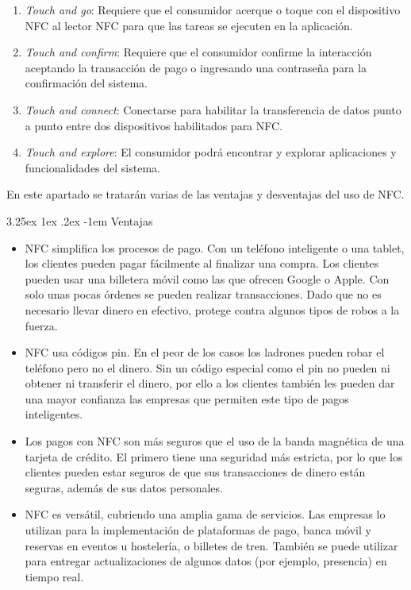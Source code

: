 \documentclass[12pt,a4paper,onecolumn,oneside]{report}
\makeatletter
\newcounter{subsubsubsection}[subsubsection]
\renewcommand\paragraph{\@startsection{paragraph}{5}{\z@}%
  {3.25ex \@plus1ex \@minus.2ex}%
  {-1em}%
  {\normalfont\normalsize\bfseries}}
\makeatother
\begin{document}
\begin{enumerate}

\item \textit{Touch and go}: Requiere que el consumidor acerque o toque con el dispositivo NFC al lector NFC para que las tareas se ejecuten en la aplicación. 
\item \textit{Touch and confirm}: Requiere que el consumidor confirme la interacción aceptando la transacción de pago o ingresando una contraseña para la confirmación del sistema.
\item \textit{Touch and connect}: Conectarse para habilitar la transferencia de datos punto a punto entre dos dispositivos habilitados para NFC. 
\item \textit{Touch and explore}: El consumidor podrá encontrar y explorar aplicaciones y funcionalidades del sistema.

\end{enumerate}


\label{Ventajas y desventajas}

En este apartado se tratarán varias de las ventajas y desventajas del uso de NFC.


\paragraph{Ventajas}
\begin{itemize}
\item NFC simplifica los procesos de pago. Con un teléfono inteligente o una tablet, los clientes pueden pagar fácilmente al finalizar una compra. Los clientes pueden usar una billetera móvil como las que ofrecen Google o Apple. Con solo unas pocas órdenes se pueden realizar transacciones. Dado que no es necesario llevar dinero en efectivo, protege contra algunos tipos de robos a la fuerza.
\item NFC usa códigos pin. En el peor de los casos los ladrones pueden robar el teléfono pero no el dinero. Sin un código especial como el pin no pueden ni obtener ni transferir el dinero, por ello a los clientes también les pueden dar una mayor confianza las empresas que permiten este tipo de pagos inteligentes.
\item Los pagos con NFC son más seguros que el uso de la banda magnética de una tarjeta de crédito. El primero tiene una seguridad más estricta, por lo que los clientes pueden estar seguros de que sus transacciones de dinero están seguras, además de sus datos personales.
\item NFC es versátil, cubriendo una amplia gama de servicios. Las empresas lo utilizan para la implementación de plataformas de pago, banca móvil y reservas en eventos u hostelería, o billetes de tren. También se puede utilizar para entregar actualizaciones de algunos datos (por ejemplo, presencia) en tiempo real.
\end{itemize}
\end{document}
